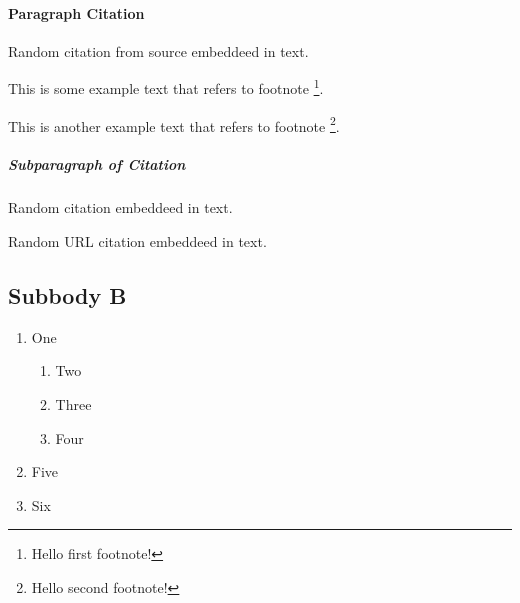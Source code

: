         \paragraph{Paragraph Citation}
            \vspace{0.3cm}
            \noindent
            Random citation from source \cite{DUMMY:1} embeddeed in text.

            \vspace{0.3cm}
            \noindent
            This is some example text that refers to footnote \footnote{\label{myfootnote1}Hello first footnote!}.

            \vspace{0.3cm}
            \noindent
            This is another example text that refers to footnote \footnote{\label{myfootnote2}Hello second footnote!}.
            
            \newpage
            
            \subparagraph{Subparagraph of Citation}
                \vspace{0.3cm}
                \noindent
                Random citation \autocite[3]{BOOK:2} embeddeed in text.
                
                \vspace{0.3cm}
                \noindent
                Random URL citation \cite{WEBSITE:1} embeddeed in text.

    \subsection{Subbody B}

        \begin{enumerate}
            \item One
            \begin{enumerate}
                \item Two
                \item Three
                \item Four
            \end{enumerate}
            \item Five
            \item Six
        \end{enumerate}

